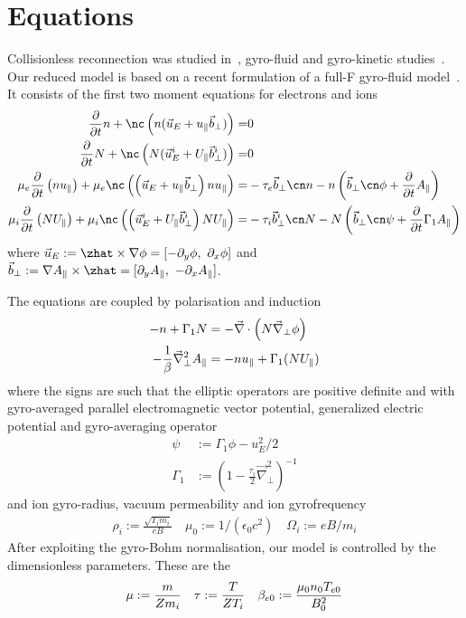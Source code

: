 \section{Equations}
Collisionless reconnection was studied in~\cite{Stanier2015}, gyro-fluid and gyro-kinetic studies~\cite{Comisso2013,Zacharias2014}.
Our reduced model is based on a recent formulation of a full-F gyro-fluid model~\cite{Madsen2013}.
It consists of the first two moment equations for electrons and ions
\begin{align}
\frac{\partial}{\partial t} \ne
+ \nc\left( \ne (\vec u_E + \ue \vec b_\perp) \right)=& 0
\\
\label{firstgyromom}
\frac{\partial}{\partial t} \Ni 
+ \nc\left( \Ni (\vec u_E^i + \Ui \vec b_\perp^i) \right)=& 0
 \\
    \mu_e \frac{\partial}{\partial t} \left( \ne\ue \right)
+  \mu_e \nc\left( \left(\vec u_E+ \ue\vec b_\perp\right) \ne\ue \right) =&
- \tau_e \vec b_\perp\cn\ne - \ne\left(\vec b_\perp\cn\phi +\frac{\partial}{\partial t}\Apar\right)
      \\
  \mu_i\frac{\partial}{\partial t} \left( \Ni\Ui \right)
      +  \mu_i\nc\left( \left(\vec u_E^i + \Ui \vec b_\perp^i\right) \Ni\Ui \right) =&
      - \tau_i  \vec b_\perp^i \cn \Ni - \Ni \left(\vec b_\perp \cn \psi + \frac{\partial}{\partial t} \Gamma_1\Apar\right)
\end{align}
where
$\vec u_E := \zhat \times \nabla\phi = [-\partial_y \phi,\ \partial_x \phi]$ and
$\bperp := \nabla \Apar \times \zhat = [\partial_y \Apar,\ -\partial_x \Apar]$.

The equations are coupled by polarisation and induction
\begin{align}
 -n  + \Gamma_1 N &= -\vec{\nabla}\cdot\left(N \vec{\nabla}_\perp \phi\right) \\
 -\frac{1}{\beta} \vec{\nabla}_\perp^2 A_\parallel &=  -n  u_\parallel + \Gamma_1 (N U_\parallel)
\end{align}
where the signs are such that the elliptic operators are positive definite and
with gyro-averaged parallel electromagnetic vector potential, generalized electric potential and gyro-averaging operator
\begin{align}
 \psi &:= \Gamma_1 \phi - u_E^2 /2  \\
  \Gamma_1 &:= (1-\frac{\tau_i}{2} \vec{\nabla}_\perp^2 )^{-1}
\end{align}
and ion gyro-radius, vacuum permeability and ion gyrofrequency
\begin{align}
  \rho_{i}   := \frac{\sqrt{T_{i} m_i}}{e B} \quad
  \mu_0 := 1/(\epsilon_0 c^2) \quad
  \Omega_i := e B / m_i
\end{align}
After exploiting the gyro-Bohm normalisation, our model is controlled by the dimensionless parameters. These
are the
\begin{align}
 \mu   :=  \frac{m}{Z m_i} \quad
 \tau  :=  \frac{T}{ Z T_i}\quad
 \beta_{e0} :=  \frac{\mu_0 n_0 T_{e0} }{ B_0^2 }
\end{align}

